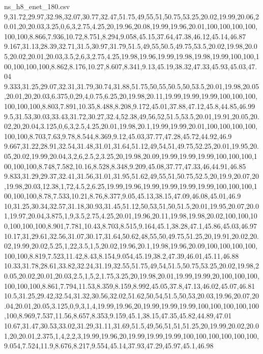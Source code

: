 \begin{filecontents*}[overwrite]{ns_h8_enet_180.csv}
9,31.72,29.97,32.98,32.07,30.77,32.47,51.75,49,55,51,50.75,53.25,20.02,19.99,20.06,20.01,20,20.03,3.25,0,6,3,2.75,4.25,20,19.96,20.08,19.99,19.96,20.01,100,100,100,100,100,100,8.866,7.936,10.72,8.751,8.294,9.058,45.15,37.64,47.38,46.12,45.14,46.87
9.167,31.13,28.39,32.71,31.5,30.97,31.79,51.5,49,55,50.5,49.75,53.5,20.02,19.98,20.05,20.02,20.01,20.03,3.5,2,6,3,2.75,4.25,19.98,19.96,19.99,19.98,19.98,19.99,100,100,100,100,100,100,8.862,8.176,10.27,8.607,8.341,9.13,45.19,38.32,47.33,45.93,45.03,47.04
9.333,31.25,29.07,32.31,31.79,30.74,31.88,51.75,50,55,50.5,50,53.5,20.01,19.98,20.05,20.01,20,20.03,6.375,0,29,4,0.75,6.25,20,19.98,20.11,19.99,19.99,19.99,100,100,100,100,100,100,8.803,7.891,10.35,8.488,8.208,9.172,45.01,37.88,47.12,45.8,44.85,46.99
9.5,31.53,30.03,33.43,31.72,30.27,32.4,52.38,49,56,52,51.5,53.5,20.01,19.91,20.05,20.02,20,20.04,3.125,0,6,3,2.5,4.25,20.01,19.98,20.1,19.99,19.99,20.01,100,100,100,100,100,100,8.703,7.63,9.78,8.544,8.369,9.12,45.03,37.77,47.28,45.72,44.92,46.9
9.667,31.22,28.91,32.54,31.48,31.01,31.64,51.12,49,54,51,49.75,52.25,20.01,19.95,20.05,20.02,19.99,20.04,3,2,6,2.5,2,3.25,20,19.98,20.09,19.99,19.99,19.99,100,100,100,100,100,100,8.748,7.582,10.16,8.528,8.348,9.209,45.08,37.77,47.33,46,44.91,46.85
9.833,31.29,29.37,32.41,31.56,31.01,31.95,51.62,49,55,51,50.75,52.5,20,19.9,20.07,20,19.98,20.03,12.38,1,72,4.5,2,6.25,19.99,19.96,19.99,19.99,19.99,19.99,100,100,100,100,100,100,8.78,7.533,10.21,8.76,8.377,9.05,45.13,38.15,47.09,46.08,45.01,46.9
10,31.25,30.34,32.57,31.18,30.93,31.45,51.12,50,53,51,50,51.5,20.01,19.95,20.07,20.01,19.97,20.04,3.875,1,9,3.5,2.75,4.25,20.01,19.96,20.11,19.98,19.98,20.02,100,100,100,100,100,100,8.901,7.781,10.43,8.703,8.515,9.164,45.1,38.28,47.1,45.86,45.03,46.97
10.17,31,29.61,32.56,31.07,30.17,31.64,50.62,48,55,50,49.75,51.25,20,19.91,20.02,20.02,19.99,20.02,5.25,1,22,3.5,1,5,20.02,19.96,20.1,19.98,19.96,20.09,100,100,100,100,100,100,8.819,7.523,11.42,8.43,8.154,9.054,45.19,38.2,47.39,46.01,45.11,46.88
10.33,31.78,28.61,33.82,32.24,31.19,32.55,51.75,49,54,51.5,50.75,53.25,20.02,19.98,20.05,20.02,20.01,20.03,2.5,1,5,2,1.75,3.25,20,19.98,20.01,19.99,19.99,20,100,100,100,100,100,100,8.861,7.794,11.53,8.359,8.159,8.992,45.05,37.8,47.13,46.02,45.07,46.81
10.5,31.25,29.42,32.54,31.32,30.56,32.02,51.62,50,54,51.5,50,53,20.03,19.96,20.07,20.04,20.01,20.05,3.125,0,9,3,1,4,19.99,19.96,20,19.99,19.99,19.99,100,100,100,100,100,100,8.969,7.537,11.56,8.657,8.353,9.159,45.1,38.15,47.35,45.82,44.89,47.01
10.67,31.47,30.53,33.02,31.29,31.11,31.69,51.5,49,56,51,51,51.25,20,19.99,20.02,20.01,20,20.01,2.375,1,4,2,2,3,19.99,19.96,20,19.99,19.99,19.99,100,100,100,100,100,100,9.054,7.524,11.9,8.676,8.217,9.554,45.14,37.93,47.29,45.97,45.1,46.98

\end{filecontents*}
